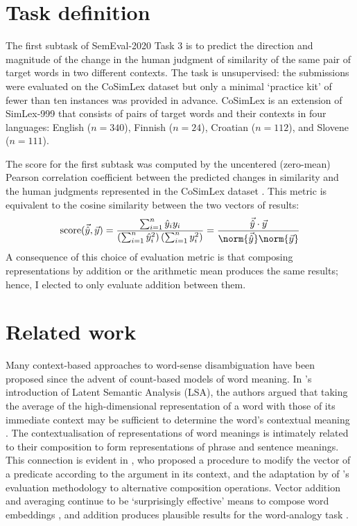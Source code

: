 \section{Task definition}
\label{task-definition}

The first subtask of SemEval-2020 Task 3 is to predict the direction and magnitude of
the change in the human judgment of similarity of the same pair of target words in two
different contexts.
The task is unsupervised: the submissions were evaluated on the CoSimLex dataset
\parencite[39-42]{Armendariz2020} but only a minimal `practice kit' of fewer than ten
instances was provided in advance.
CoSimLex is an extension of SimLex-999 \parencite{Hill2015} that consists of pairs of
target words and their contexts in four languages: English ($n = 340$), Finnish
($n = 24$), Croatian ($n = 112$), and Slovene ($n = 111$).

The score for the first subtask was computed by the uncentered (zero-mean) Pearson
correlation coefficient between the predicted changes in similarity and the human
judgments represented in the CoSimLex dataset \parencite[42]{Armendariz2020}.
This metric is equivalent to the cosine similarity between the two vectors of results:
\begin{equation}
  \text{score}(\vec{\hat{y}}, \vec{y})
  = \frac{\sum_{i = 1}^{n} \hat{y}_i y_i}{\left( \sum_{i = 1}^{n} \hat{y}_i^2 \right)\left( \sum_{i = 1}^{n} y_i^2 \right)}
  = \frac{\vec{\hat{y}} \cdot \vec{y}}{\norm{\vec{\hat{y}}} \norm{\vec{y}}}
\end{equation}
A consequence of this choice of evaluation metric is that composing representations by
addition or the arithmetic mean produces the same results; hence, I elected to only
evaluate addition between them.

\section{Related work}

Many context-based approaches to word-sense disambiguation have been proposed since the
advent of count-based models of word meaning.
In \textcite{Landauer1997}'s introduction of Latent Semantic Analysis (LSA), the authors
argued that taking the average of the high-dimensional representation of a word with
those of its immediate context may be sufficient to determine the word's contextual
meaning \parencite*[229-230]{Landauer1997}.
The contextualisation of representations of word meanings is intimately related to their
composition to form representations of phrase and sentence meanings.
This connection is evident in \textcite{Kintsch2001}, who proposed a procedure to
modify the vector of a predicate according to the argument in its context, and
the adaptation by \textcite{Mitchell2008} of \citeauthor{Kintsch2001}'s evaluation
methodology to alternative composition operations.
Vector addition and averaging continue to be `surprisingly effective' means to
compose word embeddings \parencite[10]{Boleda2020}, and addition produces plausible
results for the word-analogy task \parencite[e.g.][]{Mikolov2013a}.

